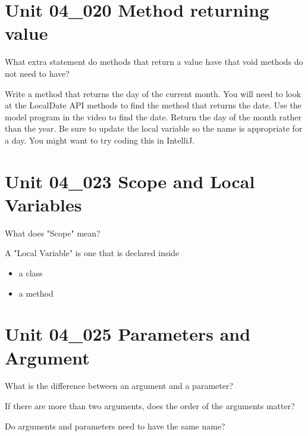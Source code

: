 \documentclass[letterpaper,12pt]{exam}
\newcommand{\unit}{Unit 04}
\begin{document}
\begin{questions}
\section*{\unit\_020 Method returning value} %
\begin{samepage}
	\question What extra statement do methods that return a value have that void methods do not need to have?
	\vspace{5mm}
\end{samepage}

\clearpage

\begin{samepage}
	\question Write a method that returns the day of the current month.  You will need to look at the LocalDate API methods to find the method that returns the date.  Use the model program in the video to find the date.  Return the day of the month rather than the year.  Be sure to update the local variable so the name is appropriate for a day.  You might want to try coding this in IntelliJ.  
	\vspace{55mm}
\end{samepage}

\section*{\unit\_023 Scope and Local Variables} %
\begin{samepage}
	\question What does "Scope" mean?
	\vspace{5mm}
\end{samepage}
\begin{samepage}
	\question A "Local Variable" is one that is declared inside
	  \begin{itemize}
		\item 
		\vspace{5mm}a class
		\item 
		\vspace{5mm}a method
	   \end{itemize}
\end{samepage}
\section*{\unit\_025 Parameters and Argument} %

\begin{samepage}
	\question What is the difference between an argument and a parameter?
	\vspace{5mm}
\end{samepage}
\begin{samepage}
	\question If there are more than two arguments, does the order of the arguments matter?
	\vspace{5mm}
\end{samepage}
\begin{samepage}
	\question Do arguments and parameters need to have the same name? 
	\vspace{5mm}
\end{samepage}


\end{questions}
\end{document}

